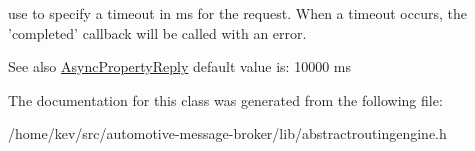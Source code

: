 use to specify a timeout in ms for the request. When a timeout occurs, the 'completed' callback will be called with an error. 

\begin{DoxySeeAlso}{See also}
\hyperlink{classAsyncPropertyReply}{Async\+Property\+Reply} default value is\+: 10000 ms 
\end{DoxySeeAlso}


The documentation for this class was generated from the following file\+:\begin{DoxyCompactItemize}
\item 
/home/kev/src/automotive-\/message-\/broker/lib/abstractroutingengine.\+h\end{DoxyCompactItemize}
